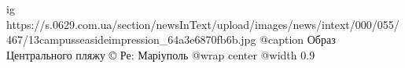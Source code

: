  
 
 
 
 

\ifcmt
  ig https://s.0629.com.ua/section/newsInText/upload/images/news/intext/000/055/467/13campusseasideimpression_64a3e6870fb6b.jpg
  @caption Образ Центрального пляжу © Ре: Маріуполь
  @wrap center
  @width 0.9
\fi
